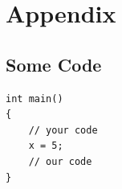 \documentclass[11pt,a4paper]{article}
\begin{document}

\clearpage
\section*{Appendix}
\subsection*{Some Code}
\begin{lstlisting}
int main()
{
	// your code
	x = 5;
	// our code
}

\end{lstlisting}
\end{document}
